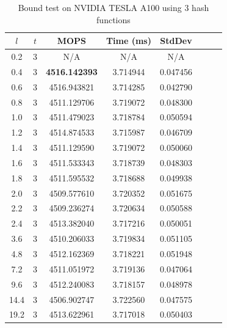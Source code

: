 \documentclass[10pt,twocolumn,letterpaper]{article}
\begin{document}
\begin{table}[!h]
    \centering
   \begin{tabular}{@{}c|ccccccc@{}}
\toprule
$l$ & $t$ & MOPS    & Time (ms)& StdDev  \\ \midrule
0.2 & 3 & N/A & N/A & N/A \\
0.4 & 3 & \textbf{4516.142393} & 3.714944 & 0.047456 \\
0.6 & 3 & 4516.943821 & 3.714285 & 0.042790 \\
0.8 & 3 & 4511.129706 & 3.719072 & 0.048300 \\
1.0 & 3 & 4511.479023 & 3.718784 & 0.050594 \\
1.2 & 3 & 4514.874533 & 3.715987 & 0.046709 \\
1.4 & 3 & 4511.129590 & 3.719072 & 0.050060 \\
1.6 & 3 & 4511.533343 & 3.718739 & 0.048303 \\
1.8 & 3 & 4511.595532 & 3.718688 & 0.049938 \\
2.0 & 3 & 4509.577610 & 3.720352 & 0.051675 \\
2.2 & 3 & 4509.236274 & 3.720634 & 0.050588 \\
2.4 & 3 & 4513.382040 & 3.717216 & 0.050051 \\
3.6 & 3 & 4510.206033 & 3.719834 & 0.051105 \\
4.8 & 3 & 4512.162369 & 3.718221 & 0.051948 \\
7.2 & 3 & 4511.051972 & 3.719136 & 0.047064 \\
9.6 & 3 & 4512.240083 & 3.718157 & 0.048978 \\
14.4 & 3 & 4506.902747 & 3.722560 & 0.047575 \\
19.2 & 3 & 4513.622961 & 3.717018 & 0.050403 \\
\bottomrule
\end{tabular}
    \caption{Bound test on NVIDIA TESLA A100 using $3$ hash functions}
    \label{tab:bound_3_A100}
\end{table}
\end{document}
